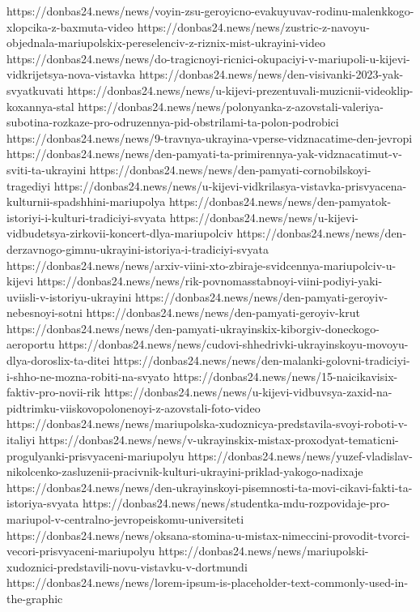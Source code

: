 https://donbas24.news/news/voyin-zsu-geroyicno-evakuyuvav-rodinu-malenkkogo-xlopcika-z-baxmuta-video
https://donbas24.news/news/zustric-z-navoyu-objednala-mariupolskix-pereselenciv-z-riznix-mist-ukrayini-video
https://donbas24.news/news/do-tragicnoyi-ricnici-okupaciyi-v-mariupoli-u-kijevi-vidkrijetsya-nova-vistavka
https://donbas24.news/news/den-visivanki-2023-yak-svyatkuvati
https://donbas24.news/news/u-kijevi-prezentuvali-muzicnii-videoklip-koxannya-stal
https://donbas24.news/news/polonyanka-z-azovstali-valeriya-subotina-rozkaze-pro-odruzennya-pid-obstrilami-ta-polon-podrobici
https://donbas24.news/news/9-travnya-ukrayina-vperse-vidznacatime-den-jevropi
https://donbas24.news/news/den-pamyati-ta-primirennya-yak-vidznacatimut-v-sviti-ta-ukrayini
https://donbas24.news/news/den-pamyati-cornobilskoyi-tragediyi
https://donbas24.news/news/u-kijevi-vidkrilasya-vistavka-prisvyacena-kulturnii-spadshhini-mariupolya
https://donbas24.news/news/den-pamyatok-istoriyi-i-kulturi-tradiciyi-svyata
https://donbas24.news/news/u-kijevi-vidbudetsya-zirkovii-koncert-dlya-mariupolciv
https://donbas24.news/news/den-derzavnogo-gimnu-ukrayini-istoriya-i-tradiciyi-svyata
https://donbas24.news/news/arxiv-viini-xto-zbiraje-svidcennya-mariupolciv-u-kijevi
https://donbas24.news/news/rik-povnomasstabnoyi-viini-podiyi-yaki-uviisli-v-istoriyu-ukrayini
https://donbas24.news/news/den-pamyati-geroyiv-nebesnoyi-sotni
https://donbas24.news/news/den-pamyati-geroyiv-krut
https://donbas24.news/news/den-pamyati-ukrayinskix-kiborgiv-doneckogo-aeroportu
https://donbas24.news/news/cudovi-shhedrivki-ukrayinskoyu-movoyu-dlya-doroslix-ta-ditei
https://donbas24.news/news/den-malanki-golovni-tradiciyi-i-shho-ne-mozna-robiti-na-svyato
https://donbas24.news/news/15-naicikavisix-faktiv-pro-novii-rik
https://donbas24.news/news/u-kijevi-vidbuvsya-zaxid-na-pidtrimku-viiskovopolonenoyi-z-azovstali-foto-video
https://donbas24.news/news/mariupolska-xudoznicya-predstavila-svoyi-roboti-v-italiyi
https://donbas24.news/news/v-ukrayinskix-mistax-proxodyat-tematicni-progulyanki-prisvyaceni-mariupolyu
https://donbas24.news/news/yuzef-vladislav-nikolcenko-zasluzenii-pracivnik-kulturi-ukrayini-priklad-yakogo-nadixaje
https://donbas24.news/news/den-ukrayinskoyi-pisemnosti-ta-movi-cikavi-fakti-ta-istoriya-svyata
https://donbas24.news/news/studentka-mdu-rozpovidaje-pro-mariupol-v-centralno-jevropeiskomu-universiteti
https://donbas24.news/news/oksana-stomina-u-mistax-nimeccini-provodit-tvorci-vecori-prisvyaceni-mariupolyu
https://donbas24.news/news/mariupolski-xudoznici-predstavili-novu-vistavku-v-dortmundi
https://donbas24.news/news/lorem-ipsum-is-placeholder-text-commonly-used-in-the-graphic
